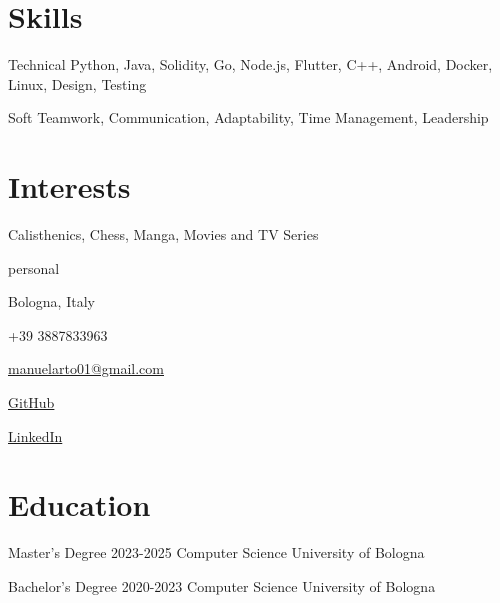 \documentclass{tccv}
\begin{document}
\section{Skills}

\begin{factlist}

\item{Technical}
     {Python, Java, Solidity, Go, Node.js, Flutter, C++, Android, Docker, Linux, Design, Testing} \\

\item{Soft}
     {Teamwork, Communication, Adaptability, Time Management, Leadership}

\end{factlist}


\section{Interests}

Calisthenics, Chess, Manga, Movies and TV Series


\newpage


\begin{keyvaluelist}{personal}
    \item[\faHome] Bologna, Italy
    \item[\faPhone] +39 3887833963
    \item[\faEnvelope] \href{mailto:manuelarto01@gmail.com}{manuelarto01@gmail.com}
    \item[\faGithub] \href{https://github.com/manuelarto}{GitHub}
    \item[\faLinkedin] \href{https://www.linkedin.com/in/manuel-arto-696012203/}{LinkedIn}
\end{keyvaluelist}


\section{Education}

\begin{yearlist}

\item[Master's Degree]{2023-2025}
     {Computer Science}
     {University of Bologna}%

\item[Bachelor's Degree]{2020-2023}
    {Computer Science}
    {University of Bologna}

\end{yearlist}
\end{document}
